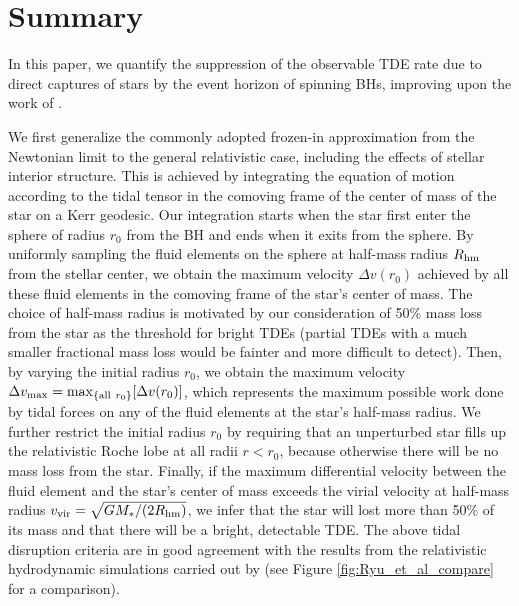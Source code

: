 \documentclass[useAMS,usenatbib]{mn2e}
\def\mr{\mathrm}
\def\mstar{M_*}
\def\Rhm{R_{\rm hm}}
\begin{document}
\section{Summary}\label{sec:summary}

In this paper, we quantify the suppression of the observable TDE rate due to direct captures of stars by the event horizon of spinning BHs, improving upon the work of \citet{Kesden2012}.

We first generalize the commonly adopted frozen-in approximation from the Newtonian limit to the general relativistic case, including the effects of stellar interior structure. This is achieved by integrating the equation of motion according to the tidal tensor in the comoving frame of the center of mass of the star on a Kerr geodesic. Our integration starts when the star first enter the sphere of radius $r_0$ from the BH and ends when it exits from the sphere. By uniformly sampling the fluid elements on the sphere at half-mass radius $\Rhm$ from the stellar center, we obtain the maximum velocity $\Delta v(r_0)$ achieved by all these fluid elements in the comoving frame of the star's center of mass. The choice of half-mass radius is motivated by our consideration of 50\% mass loss from the star as the threshold for bright TDEs (partial TDEs with a much smaller fractional mass loss would be fainter and more difficult to detect). Then, by varying the initial radius $r_0$, we obtain the maximum velocity $\Delta v_{\rm max} = \max_{\{\mr{all\ } r_0\}}[\Delta v(r_0)]$, which represents the maximum possible work done by tidal forces on any of the fluid elements at the star's half-mass radius. We further restrict the initial radius $r_0$ by requiring that an unperturbed star fills up the relativistic Roche lobe at all radii $r < r_0$, because otherwise there will be no mass loss from the star. Finally, if the maximum differential velocity between the fluid element and the star's center of mass exceeds the virial velocity at half-mass radius $v_{\rm vir} = \sqrt{G\mstar/(2\Rhm)}$, we infer that the star will lost more than 50\% of its mass and that there will be a bright, detectable TDE. The above tidal disruption criteria are in good agreement with the results from the relativistic hydrodynamic simulations carried out by \citet{Ryu2020d} (see Figure \ref{fig:Ryu_et_al_compare} for a comparison).
\end{document}
